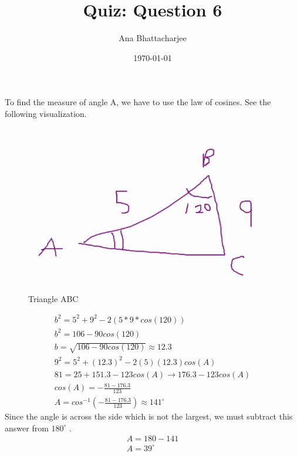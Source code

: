 \documentclass{article}
\begin{document}
\title{Quiz: Question 6}
\author{Ana Bhattacharjee}
\date{\today}
\maketitle

\begin{center}
To find the measure of angle A, we have to use the law of cosines. See the following visualization.
\begin{figure}[!htbp]
  \includegraphics[width=1.0\columnwidth]{triangle}
  \caption{Triangle ABC}
\end{figure}
\begin{align}
b^2 = 5^2 + 9^2 - 2(5*9*cos(120)) \\
b^2 = 106 - 90cos(120) \\
b = \sqrt{106 - 90cos(120)} \approx 12.3 \\
9^2 = 5^2 + (12.3)^2 - 2(5)(12.3)cos(A) \\
81 = 25 + 151.3 - 123cos(A) \rightarrow 176.3 - 123cos(A) \\
cos(A) = -\frac{81 - 176.3}{123} \\
A = cos^{-1}(-\frac{81 - 176.3}{123}) \approx 141^{\circ}
\end{align}
Since the angle is across the side which is not the largest, we must subtract this answer from $180^{\circ}$ .
\begin{align}
  A = 180 - 141 \\
  A = 39^{\circ} 
\end{align}
\end{center}
\end{document}
